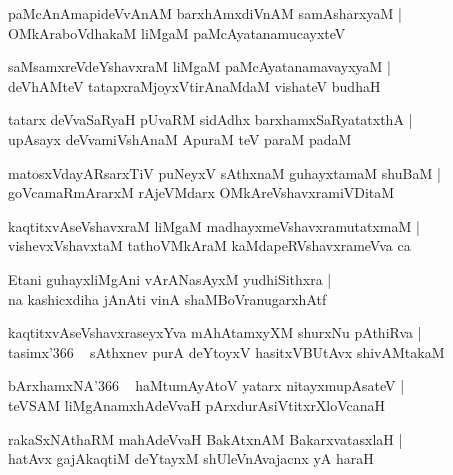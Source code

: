 \documentclass[twoside,12pt,openright]{book}
\newcounter{shloka}[chapter]
\begin{document}
\begin{shloka}
paMcAnAmapideVvAnAM barxhAmxdiVnAM samAsharxyaM |\\
OMkAraboVdhakaM liMgaM paMcAyatanamucayxteV 
\end{shloka}

\begin{shloka}
saMsamxreVdeYshavxraM liMgaM paMcAyatanamavayxyaM |\\
deVhAMteV tatapxraMjoyxVtirAnaMdaM vishateV budhaH 
\end{shloka}

\begin{shloka}
tatarx deVvaSaRyaH pUvaRM sidAdhx barxhamxSaRyatatxthA |\\
upAsayx deVvamiVshAnaM ApuraM teV paraM padaM 
\end{shloka}

\begin{shloka}
matosxVdayARsarxTiV puNeyxV sAthxnaM guhayxtamaM shuBaM |\\
goVcamaRmArarxM rAjeVMdarx OMkAreVshavxramiVDitaM 
\end{shloka}

\begin{shloka}
kaqtitxvAseVshavxraM liMgaM madhayxmeVshavxramutatxmaM |\\
vishevxVshavxtaM tathoVMkAraM kaMdapeRVshavxrameVva ca 
\end{shloka}

\begin{shloka}
Etani guhayxliMgAni vArANasAyxM yudhiSithxra |\\
na kashicxdiha jAnAti vinA shaMBoVranugarxhAtf 
\end{shloka}

\begin{shloka}
kaqtitxvAseVshavxraseyxYva mAhAtamxyXM shurxNu pAthiRva |\\
tasimx\char'366 ~ sAthxnev purA deYtoyxV hasitxVBUtAvx shivAMtakaM 
\end{shloka}

\begin{shloka}
bArxhamxNA\char'366 ~ haMtumAyAtoV yatarx nitayxmupAsateV |\\
teVSAM liMgAnamxhAdeVvaH pArxdurAsiVtitxrXloVcanaH 
\end{shloka}

\begin{shloka}
rakaSxNAthaRM mahAdeVvaH BakAtxnAM BakarxvatasxlaH |\\
hatAvx gajAkaqtiM deYtayxM shUleVnAvajacnx yA haraH 
\end{shloka}
\end{document}
